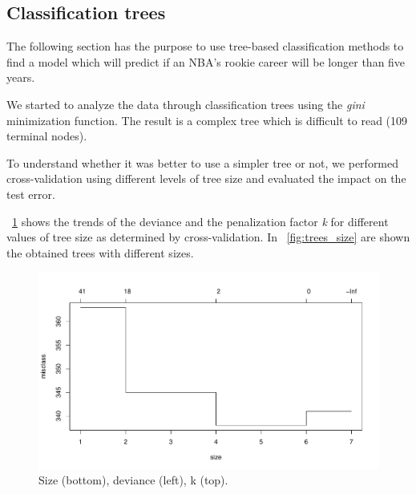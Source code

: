 \subsection{Classification trees}

The following section has the purpose to use tree-based classification methods to find a model which will predict if an NBA's rookie career will be longer than five years.

We started to analyze the data through classification trees using the \textit{gini} minimization function. The result is a complex tree which is difficult to read (109 terminal nodes).

To understand whether it was better to use a simpler tree or not, we performed cross-validation using different levels of tree size and evaluated the impact on the test error.

\Fig~\ref{fig:tree_cv_plot} shows the trends of the deviance and the penalization factor \textit{k} for different values of tree size as determined by cross-validation. In \Fig~\ref{fig:trees_size} are shown the obtained trees with different sizes.

\begin{figure}[H]
	\centering
	\includegraphics[width=0.5\linewidth]{ImageFiles/Classification/Trees/tree_cv_plot.pdf}
	\caption{Size (bottom), deviance (left), k (top).}
	\label{fig:tree_cv_plot}
\end{figure}

